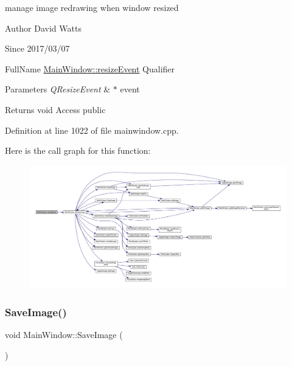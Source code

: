 manage image redrawing when window resized

\begin{DoxyAuthor}{Author}
David Watts 
\end{DoxyAuthor}
\begin{DoxySince}{Since}
2017/03/07
\end{DoxySince}
Full\+Name \hyperlink{class_main_window_ae12f8f63791595567b6250f8bb002bda}{Main\+Window\+::resize\+Event} Qualifier 
\begin{DoxyParams}{Parameters}
{\em Q\+Resize\+Event} & $\ast$ event \\
\hline
\end{DoxyParams}
\begin{DoxyReturn}{Returns}
void Access public 
\end{DoxyReturn}


Definition at line 1022 of file mainwindow.\+cpp.

Here is the call graph for this function\+:
\nopagebreak
\begin{figure}[H]
\begin{center}
\leavevmode
\includegraphics[width=350pt]{class_main_window_ae12f8f63791595567b6250f8bb002bda_cgraph}
\end{center}
\end{figure}
\mbox{\label{class_main_window_aa816921e6ce14f558ada5c73c8a5ef20}} 
\subsubsection{\texorpdfstring{Save\+Image()}{SaveImage()}}
{\footnotesize\ttfamily void Main\+Window\+::\+Save\+Image (\begin{DoxyParamCaption}{ }\end{DoxyParamCaption})}

